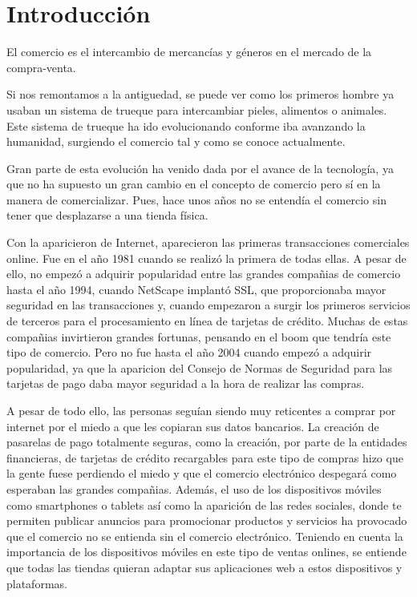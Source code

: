 \documentclass[a4paper, 12pt]{book}
\begin{document}

\cleardoublepage
\chapter{Introducción}
\label{sec:intro} %

El comercio es el intercambio de mercancías y géneros en el mercado de la compra-venta. 

Si nos remontamos a la antiguedad, se puede ver como los primeros hombre ya usaban un sistema de trueque para intercambiar pieles, alimentos o animales. Este sistema de trueque ha ido evolucionando conforme iba avanzando la humanidad, surgiendo el comercio tal y como se conoce actualmente.

Gran parte de esta evolución ha venido dada por el avance de la tecnología, ya que no ha supuesto un gran cambio en el concepto de comercio pero sí en la manera de comercializar. Pues, hace unos años no se entendía el comercio sin tener que desplazarse a una tienda física. 

Con la aparicieron de Internet, aparecieron las primeras transacciones comerciales online. Fue en el año 1981 cuando se realizó la primera de todas ellas. A pesar de ello, no empezó a adquirir popularidad entre las grandes compañias de comercio hasta el año 1994, cuando NetScape implantó SSL, que proporcionaba mayor seguridad en las transacciones y, cuando empezaron a surgir los primeros servicios de terceros para el procesamiento en línea de tarjetas de crédito. Muchas de estas compañias invirtieron grandes fortunas, pensando en el boom que tendría este tipo de comercio. Pero no fue hasta el año 2004 cuando empezó a adquirir popularidad, ya que la aparicion del Consejo de Normas de Seguridad para las tarjetas de pago daba mayor seguridad a la hora de realizar las compras. 

A pesar de todo ello, las personas seguían siendo muy reticentes a comprar por internet por el miedo a que les copiaran sus datos bancarios. La creación de pasarelas de pago totalmente seguras, como la creación, por parte de la entidades financieras, de tarjetas de crédito recargables para este tipo de compras hizo que la gente fuese perdiendo el miedo y que el comercio electrónico despegará como esperaban las grandes compañias. Además, el uso de los dispositivos móviles como smartphones o tablets así como la aparición de las redes sociales, donde te permiten publicar anuncios para promocionar productos y servicios ha provocado que el comercio no se entienda sin el comercio electrónico. Teniendo en cuenta la importancia de los dispositivos móviles en este tipo de ventas onlines, se entiende que todas las tiendas quieran adaptar sus aplicaciones web a estos dispositivos y plataformas. 
\end{document}
